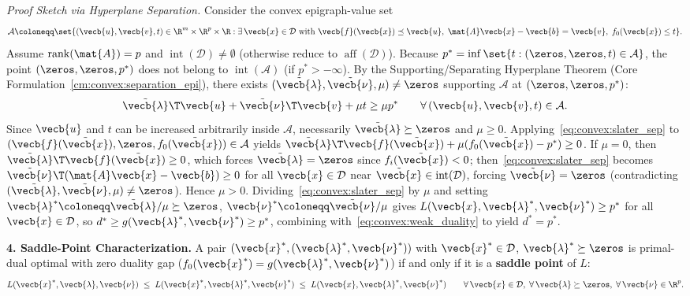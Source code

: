 \documentclass[../../../../master.tex]{subfiles}
\begin{document}
\begin{coremath}
\emph{Proof Sketch via Hyperplane Separation.} Consider the convex epigraph-value set
\[
  \mathcal{A} \coloneqq \set{(\vecb{u}, \vecb{v}, t) \in \R^m \times \R^p \times \R : \exists\,\vecb{x} \in \mathcal{D} \text{ with } \vecb{f}(\vecb{x}) \preceq \vecb{u},\; \mat{A}\vecb{x}-\vecb{b} = \vecb{v},\; f_0(\vecb{x}) \le t}.
\]
Assume $\operatorname{rank}(\mat{A}) = p$ and $\operatorname{int}(\mathcal{D}) \neq \emptyset$ (otherwise reduce to $\operatorname{aff}(\mathcal{D})$). Because $p^* = \inf \set{t : (\zeros, \zeros, t) \in \mathcal{A}}$, the point $(\zeros, \zeros, p^*)$ does not belong to $\operatorname{int}(\mathcal{A})$ (if $p^* > -\infty$). By the Supporting/Separating Hyperplane Theorem (Core Formulation~\ref{cm:convex:separation_epi}), there exists $(\tilde{\vecb{\lambda}}, \tilde{\vecb{\nu}}, \mu) \neq \zeros$ supporting $\mathcal{A}$ at $(\zeros, \zeros, p^*)$:
\begin{equation}
  \tilde{\vecb{\lambda}}\T \vecb{u} + \tilde{\vecb{\nu}}\T \vecb{v} + \mu t \ge \mu p^* \qquad \forall\,(\vecb{u}, \vecb{v}, t) \in \mathcal{A}.
  \label{eq:convex:slater_sep}
\end{equation}
Since $\vecb{u}$ and $t$ can be increased arbitrarily inside $\mathcal{A}$, necessarily $\tilde{\vecb{\lambda}} \succeq \zeros$ and $\mu \ge 0$. Applying~\eqref{eq:convex:slater_sep} to $(\vecb{f}(\tilde{\vecb{x}}), \zeros, f_0(\tilde{\vecb{x}})) \in \mathcal{A}$ yields $\tilde{\vecb{\lambda}}\T\vecb{f}(\tilde{\vecb{x}}) + \mu(f_0(\tilde{\vecb{x}}) - p^*) \ge 0$. If $\mu = 0$, then $\tilde{\vecb{\lambda}}\T\vecb{f}(\tilde{\vecb{x}}) \ge 0$, which forces $\tilde{\vecb{\lambda}} = \zeros$ since $f_i(\tilde{\vecb{x}}) < 0$; then~\eqref{eq:convex:slater_sep} becomes $\tilde{\vecb{\nu}}\T(\mat{A}\vecb{x} - \vecb{b}) \ge 0$ for all $\vecb{x} \in \mathcal{D}$ near $\tilde{\vecb{x}} \in \operatorname{int}(\mathcal{D})$, forcing $\tilde{\vecb{\nu}} = \zeros$ (contradicting $(\tilde{\vecb{\lambda}}, \tilde{\vecb{\nu}}, \mu) \neq \zeros$). Hence $\mu > 0$. Dividing~\eqref{eq:convex:slater_sep} by $\mu$ and setting $\vecb{\lambda}^* \coloneqq \tilde{\vecb{\lambda}}/\mu \succeq \zeros$, $\vecb{\nu}^* \coloneqq \tilde{\vecb{\nu}}/\mu$ gives $L(\vecb{x}, \vecb{\lambda}^*, \vecb{\nu}^*) \ge p^*$ for all $\vecb{x} \in \mathcal{D}$, so $d^* \ge g(\vecb{\lambda}^*, \vecb{\nu}^*) \ge p^*$, combining with~\eqref{eq:convex:weak_duality} to yield $d^* = p^*$.

\textbf{4. Saddle-Point Characterization.} A pair $(\vecb{x}^*, (\vecb{\lambda}^*, \vecb{\nu}^*))$ with $\vecb{x}^* \in \mathcal{D}$, $\vecb{\lambda}^* \succeq \zeros$ is primal-dual optimal with zero duality gap ($f_0(\vecb{x}^*) = g(\vecb{\lambda}^*, \vecb{\nu}^*)$) if and only if it is a \textbf{saddle point} of $L$:
\begin{equation}
  L(\vecb{x}^*, \vecb{\lambda}, \vecb{\nu}) \;\le\; L(\vecb{x}^*, \vecb{\lambda}^*, \vecb{\nu}^*) \;\le\; L(\vecb{x}, \vecb{\lambda}^*, \vecb{\nu}^*)
  \qquad \forall\,\vecb{x} \in \mathcal{D},\;\forall\,\vecb{\lambda} \succeq \zeros,\;\forall\,\vecb{\nu} \in \R^p.
  \label{eq:convex:saddle}
\end{equation}
\end{coremath}
\end{document}

